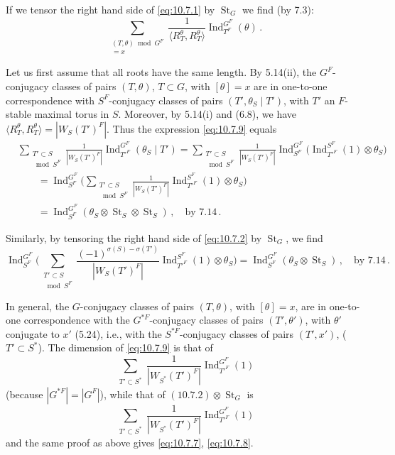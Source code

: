 \documentclass{amsart}
\theoremstyle{plain}
\theoremstyle{remark}
\DeclareMathOperator{\Ind}{Ind}
\DeclareMathOperator{\St}{St}
\begin{document}
If we tensor the right hand side of \eqref{eq:10.7.1} by $\St_G$ we find (by 7.3):
\begin{equation}\label{eq:10.7.9}
\sum_{\substack{(T, \theta) \bmod G^F \\ [\theta] = x}} \frac{1}{\langle R_T^\theta, R_T^\theta \rangle} \Ind_{T^F}^{G^F}(\theta)\,.\end{equation}

Let us first assume that all roots have the same length. By 5.14(ii), the $G^F$-conjugacy classes of pairs $(T, \theta)$, $T \subset G$, with $[\theta] = x$ are in one-to-one correspondence with $S^F$-conjugacy classes of pairs $(T', \theta_S \mid T')$, with $T'$ an $F$-stable maximal torus in $S$. Moreover, by 5.14(i) and (6.8), we have $\langle R_T^\theta, R_T^\theta \rangle = |W_S(T')^F|$. Thus the expression \eqref{eq:10.7.9} equals
\begin{align*}
&\sum_{\substack{T' \subset S \\ \bmod S^F}} \frac{1}{|W_S(T')^F|} \Ind_{T'^F}^{G^F}(\theta_S \mid T') = \sum_{\substack{T' \subset S \\ \bmod S^F}} \frac{1}{|W_S(T')^F|} \Ind_{S^F}^{G^F}\bigl(\Ind_{T'^F}^{S^F}(1) \otimes \theta_S\bigr) \\
&\qquad = \Ind_{S^F}^{G^F}\biggl(\sum_{\substack{T' \subset S \\ \bmod S^F}} \frac{1}{|W_S(T')^F|} \Ind_{T'^F}^{S^F}(1) \otimes \theta_S\biggr) \\
&\qquad = \Ind_{S^F}^{G^F}(\theta_S \otimes \St_S \otimes \St_S)\,, \quad \text{by 7.14}\,.
\end{align*}

Similarly, by tensoring the right hand side of \eqref{eq:10.7.2} by $\St_G$, we find
\[
\Ind_{S^F}^{G^F}\biggl(\sum_{\substack{T' \subset S \\ \bmod S^F}} \frac{(-1)^{\sigma(S) - \sigma(T')}}{|W_S(T')^F|} \Ind_{T'^F}^{S^F}(1) \otimes \theta_S\biggr) = \Ind_{S^F}^{G^F}(\theta_S \otimes \St_S)\,, \quad \text{by 7.14}\,.
\]

In general, the $G$-conjugacy classes of pairs $(T, \theta)$, with $[\theta] = x$, are in one-to-one correspondence with the $G^{*F}$-conjugacy classes of pairs $(T', \theta')$, with $\theta'$ conjugate to $x'$ (5.24), i.e., with the $S^{*F}$-conjugacy classes of pairs $(T', x')$, ($T' \subset S^*$). The dimension of \eqref{eq:10.7.9} is that of
\[
\sum_{\substack{T' \subset S^*}} \frac{1}{|W_{S^*}(T')^F|} \Ind_{T'^F}^{G^F}(1)
\]
(because $|G^{*F}| = |G^F|$), while that of $(10.7.2) \otimes \St_G$ is
\[
\sum_{\substack{T' \subset S^*}} \frac{1}{|W_{S^*}(T')^F|} \Ind_{T'^F}^{G^F}(1)
\]
and the same proof as above gives \eqref{eq:10.7.7}, \eqref{eq:10.7.8}.
\end{document}
